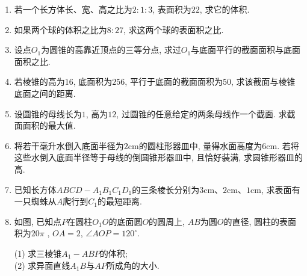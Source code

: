 \documentclass[10pt,a4paper]{article}
\begin{document}
\begin{enumerate}[1.]

\item 若一个长方体长、宽、高之比为$2:1:3$, 表面积为$22$, 求它的体积.
\vspace*{3cm}
\item 如果两个球的体积之比为$8:27$, 求这两个球的表面积之比.
\vspace*{3cm}
\item 设点$O_1$为圆锥的高靠近顶点的三等分点, 求过$O_1$与底面平行的截面面积与底面面积之比.
\vspace*{3cm}
\item 若棱锥的高为$16$, 底面积为$256$, 平行于底面的截面面积为$50$, 求该截面与棱锥底面之间的距离.
\vspace*{3cm}
\item 设圆锥的母线长为$1$, 高为$12$, 过圆锥的任意给定的两条母线作一个截面. 求截面面积的最大值.
\vspace*{3cm}
\item 将若干毫升水倒入底面半径为$2\text{cm}$的圆柱形器皿中, 量得水面高度为$6\text{cm}$. 若将这些水倒入底面半径等于母线的倒圆锥形器皿中, 且恰好装满, 求圆锥形器皿的高.
\vspace*{3cm}
\item 已知长方体$ABCD-A_1B_1C_1D_1$的三条棱长分别为$3\text{cm}$、$2\text{cm}$、$1\text{cm}$, 求表面有一只蜘蛛从$A$爬行到$C_1$的最短距离.
\vspace*{3cm}
\item 如图, 已知点$P$在圆柱$O_1O$的底面圆$O$的圆周上, $AB$为圆$O$的直径, 圆柱的表面积为$20\pi$ , $OA=2$, $\angle AOP=120^\circ$.
\begin{center}
\end{center}
(1) 求三棱锥$A_1-ABP$的体积;\\
(2) 求异面直线$A_1B$与$AP$所成角的大小.
\vspace*{3cm}

\end{enumerate}
\end{document}
